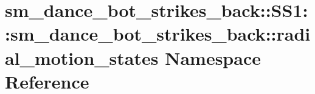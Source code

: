 \hypertarget{namespacesm__dance__bot__strikes__back_1_1SS1_1_1sm__dance__bot__strikes__back_1_1radial__motion__states}{}\section{sm\+\_\+dance\+\_\+bot\+\_\+strikes\+\_\+back\+:\+:S\+S1\+:\+:sm\+\_\+dance\+\_\+bot\+\_\+strikes\+\_\+back\+:\+:radial\+\_\+motion\+\_\+states Namespace Reference}
\label{namespacesm__dance__bot__strikes__back_1_1SS1_1_1sm__dance__bot__strikes__back_1_1radial__motion__states}
